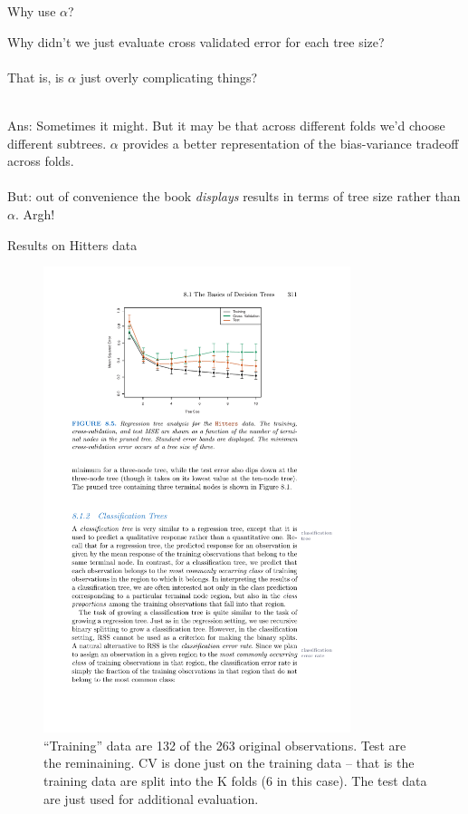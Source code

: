 \documentclass[mathserif, aspectratio=169]{beamer}
\begin{document}
\begin{frame}{Why use $\alpha$?}

Why didn't we just evaluate cross validated error for each tree size?\\~\\

That is, is $\alpha$ just overly complicating things?\\~\\

\pause

Ans: Sometimes it might.  But it may be that across different folds we'd choose different subtrees.  $\alpha$ provides a better representation of the bias-variance tradeoff across folds.  \\~\\

But: out of convenience the book \textit{displays} results in terms of tree size rather than $\alpha$.  Argh!

\end{frame}

\begin{frame}{Results on Hitters data}
\begin{figure}
\includegraphics[width=0.8\textwidth]{MSE_vs_treesize}
\caption*{``Training'' data are 132 of the 263 original observations.  Test are the reminaining.  CV is done just on the training data -- that is the training data are split into the K folds (6 in this case).  The test data are just used for additional evaluation.}
\end{figure}
\end{frame}
\end{document}
